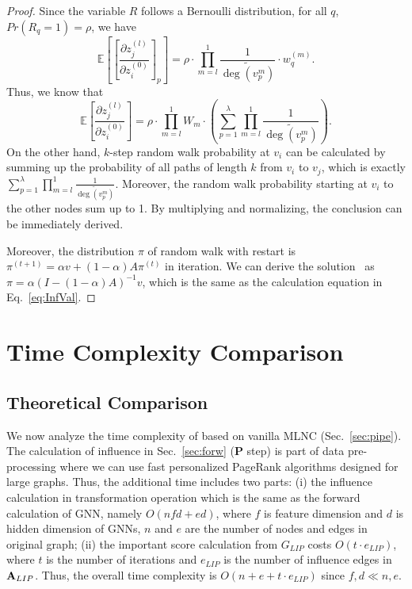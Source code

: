 \begin{proof}
Since the variable $R$ follows a Bernoulli distribution, for all $q$, $Pr(R_q = 1) = \rho$, we have 
\begin{equation}
    \mathbb{E}\left[  \left[\frac{\partial z_j^{(l)}}{\partial z_i^{(0)}}\right]_p \right]=\rho \cdot \prod_{m=l}^1 \frac{1}{\widetilde{\operatorname{deg}\left(v_p^m\right)}} \cdot w_q^{(m)}.
\end{equation}
Thus, we know that
\begin{equation}
     \mathbb{E} \left[\frac{\partial z_j^{(l)}}{\partial z_i^{(0)}}\right] = \rho \cdot \prod_{m=l}^1 W_m \cdot \left( \sum_{p=1}^{\lambda} \prod_{m=l}^1 \frac{1}{\widetilde{\operatorname{deg}\left(v_p^m\right)}}  \right).
\end{equation}
On the other hand, $k$-step random walk probability at $v_i$ can be calculated by summing up the probability of all paths of length $k$ from $v_i$ to $v_j$, which is exactly $\sum_{p=1}^{\lambda} \prod_{m=l}^1 \frac{1}{\widetilde{\operatorname{deg}\left(v_p^m\right)}}$. Moreover, the random walk probability starting at $v_i$ to the other nodes sum up to 1. 
By multiplying and normalizing, the conclusion can be immediately derived.

Moreover, the distribution $\pi$ of random walk with restart is $\pi^{(t+1)}=\alpha v+(1-\alpha) A \pi^{(t)}$ in iteration.
We can derive the solution~\citep{gasteiger2018predict} as $\pi=\alpha\left(I-(1-\alpha) A\right)^{-1} v$, which is the same as the calculation equation in Eq.~\ref{eq:InfVal}.
\end{proof}



\section{Time Complexity Comparison} \label{app:Time}

\subsection{Theoretical Comparison}

We now analyze the time complexity of \model based on vanilla MLNC (Sec.~\ref{sec:pipe}). The calculation of influence in Sec.~\ref{sec:forw} (\textbf{P} step) is part of data pre-processing where we can use fast personalized PageRank algorithms designed for large graphs. Thus, the additional time includes two parts: (i) the influence calculation in transformation operation which is the same as the forward calculation of GNN, namely $O(nfd+ed)$, where $f$ is feature dimension and $d$ is hidden dimension of GNNs, $n$ and $e$ are the number of nodes and edges in original graph; (ii) the important score calculation from $G_{LIP}$ costs $O(t \cdot e_{LIP})$, where $t$ is the number of iterations and $e_{LIP}$ is the number of influence edges in $\mathbf{A}_{LIP}$.
Thus, the overall time complexity is $O(n + e + t \cdot e_{LIP})$ since $f, d \ll n, e$. 

